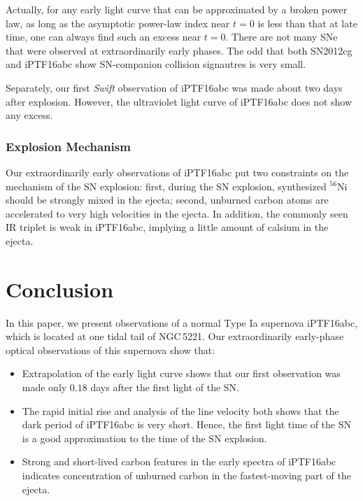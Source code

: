 \documentclass[twocolumn]{aastex61}
\begin{document}
Actually, for any early light curve that can be approximated by a
broken power law, as long as the asymptotic power-law index near $t=0$
is less than that at late time, one can always find such an excess
near $t=0$. There are not many SNe that were observed at
extraordinarily early phases. The odd that both SN2012cg and iPTF16abc
show SN-companion collision signautres is very small.

Separately, our first \textit{Swift} observation of iPTF16abc was made
about two days after explosion. However, the ultraviolet light curve of
iPTF16abc does not show any excess. 

\subsubsection{Explosion Mechanism}

Our extraordinarily early observations of iPTF16abc put two constraints
on the mechanism of the SN explosion: first, during the SN explosion,
synthesized $^{56}$Ni should be strongly mixed in the ejecta; second,
unburned carbon atoms are accelerated to very high velocities in the ejecta.
In addition, the commonly seen  IR triplet is weak in iPTF16abc,
implying a little amount of calsium in the ejecta. 

\section{Conclusion}
\label{sec:conclusion}

In this paper, we present observations of a normal Type Ia supernova
iPTF16abc, which is located at one tidal tail of NGC\,5221. Our extraordinarily
early-phase optical observations of this supernova show that:
\begin{itemize}
\item Extrapolation of the early light curve shows that our first observation
  was made only $0.18$ days after the first light of the SN.
\item The rapid initial rise and analysis of the line velocity both shows that
  the dark period of iPTF16abc is very short. Hence, the first light time of
  the SN is a good approximation to the time of the SN explosion.
\item Strong and short-lived carbon features in the early spectra of iPTF16abc
  indicates concentration of unburned carbon in the fastest-moving part of the
  ejecta.
\end{itemize}

\acknowledgements



\end{document}
